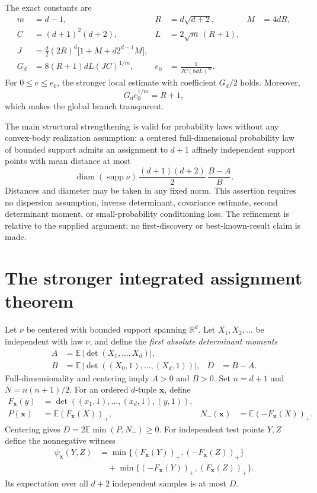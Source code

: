 \documentclass[11pt,letterpaper]{article}
\newcommand{\EE}{\mathbb E}
\newcommand{\RR}{\mathbb R}
\newcommand{\supp}{\operatorname{supp}}
\newcommand{\diam}{\operatorname{diam}}
\newcommand{\pos}[1]{(#1)_+}
\begin{document}
The exact constants are
\begin{align*}
 m&=d-1, & R&=d\sqrt{d+2}, & M&=4dR,\\
 C&=(d+1)^2(d+2), & L&=2\sqrt m\,(R+1),\\
 J&=\frac d2(2R)^d\bigl[1+M+d2^{d-1}M\bigr],\\
 G_d&=8(R+1)dL(JC)^{1/m},
 & e_0&=\frac1{JC(8dL)^m}.
\end{align*}
For $0\le e\le e_0$, the stronger local estimate with coefficient $G_d/2$
holds. Moreover,
\[
 G_d e_0^{1/m}=R+1,
\]
which makes the global branch transparent.

The main structural strengthening is valid for probability laws without
any convex-body realization assumption: a centered full-dimensional
probability law of bounded support admits an assignment to $d+1$ affinely
independent support points with mean distance at most
\[
 \diam(\supp\nu)\,\frac{(d+1)(d+2)}2\,\frac{B-A}{B}.
\]
Distances and diameter may be taken in any fixed norm. This assertion
requires no dispersion assumption, inverse determinant, covariance
estimate, second determinant moment, or small-probability conditioning loss.
The refinement is relative to the supplied argument; no first-discovery
or best-known-result claim is made.

\section{The stronger integrated assignment theorem}
Let $\nu$ be centered with bounded support spanning $\RR^d$. Let
$X_1,X_2,\ldots$ be independent with law $\nu$, and define the
\emph{first absolute determinant moments}
\begin{align*}
 A&=\EE\,|\det(X_1,\ldots,X_d)|,\\
 B&=\EE\,|\det((X_0,1),\ldots,(X_d,1))|, & D&=B-A.
\end{align*}
Full-dimensionality and centering imply $A>0$ and $B>0$. Set $n=d+1$ and
$N=n(n+1)/2$. For an ordered $d$-tuple $\mathbf x$, define
\begin{align*}
 F_{\mathbf x}(y)&=\det((x_1,1),\ldots,(x_d,1),(y,1)),\\
 P(\mathbf x)&=\EE\pos{F_{\mathbf x}(X)}, &
 N_-(\mathbf x)&=\EE\pos{-F_{\mathbf x}(X)}.
\end{align*}
Centering gives $D=2\EE\min(P,N_-)\ge0$. For independent test points $Y,Z$
define the nonnegative witness
\begin{align*}
 \psi_{\mathbf x}(Y,Z)
 &=\min\{\pos{F_{\mathbf x}(Y)},\pos{-F_{\mathbf x}(Z)}\}\\
 &\quad+\min\{\pos{-F_{\mathbf x}(Y)},\pos{F_{\mathbf x}(Z)}\}.
\end{align*}
Its expectation over all $d+2$ independent samples is at most $D$.
\end{document}
